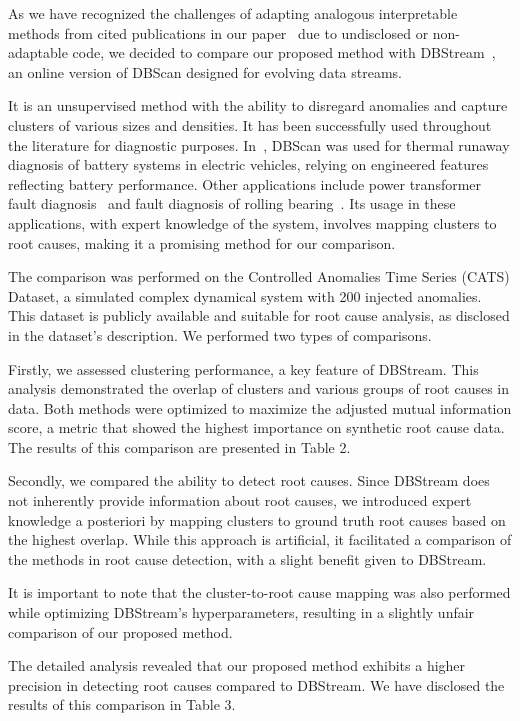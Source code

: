 \documentclass{article}
\begin{document}
\begin{enumerate}
        As we have recognized the challenges of adapting analogous interpretable methods from cited publications in our paper~\cite{Yang2022, Steenwinckel2021} due to undisclosed or non-adaptable code, we decided to compare our proposed method with DBStream~\cite{Hahsler2016}, an online version of DBScan designed for evolving data streams.

        It is an unsupervised method with the ability to disregard anomalies and capture clusters of various sizes and densities. It has been successfully used throughout the literature for diagnostic purposes. In~\cite{Li2019}, DBScan was used for thermal runaway diagnosis of battery systems in electric vehicles, relying on engineered features reflecting battery performance. Other applications include power transformer fault diagnosis~\cite{Liu2020} and fault diagnosis of rolling bearing~\cite{Li2020}.
        Its usage in these applications, with expert knowledge of the system, involves mapping clusters to root causes, making it a promising method for our comparison.

        The comparison was performed on the Controlled Anomalies Time Series (CATS) Dataset, a simulated complex dynamical system with 200 injected anomalies. This dataset is publicly available and suitable for root cause analysis, as disclosed in the dataset's description. We performed two types of comparisons.

        Firstly, we assessed clustering performance, a key feature of DBStream. This analysis demonstrated the overlap of clusters and various groups of root causes in data. Both methods were optimized to maximize the adjusted mutual information score, a metric that showed the highest importance on synthetic root cause data. The results of this comparison are presented in Table 2.

        Secondly, we compared the ability to detect root causes. Since DBStream does not inherently provide information about root causes, we introduced expert knowledge a posteriori by mapping clusters to ground truth root causes based on the highest overlap. While this approach is artificial, it facilitated a comparison of the methods in root cause detection, with a slight benefit given to DBStream.

        It is important to note that the cluster-to-root cause mapping was also performed while optimizing DBStream's hyperparameters, resulting in a slightly unfair comparison of our proposed method.

        The detailed analysis revealed that our proposed method exhibits a higher precision in detecting root causes compared to DBStream. We have disclosed the results of this comparison in Table 3.


\end{enumerate}
\end{document}
